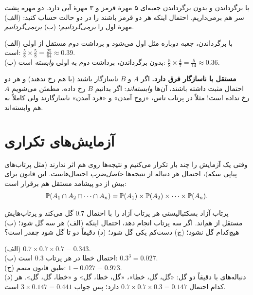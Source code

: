 \begin{example}[label=hs:ex:replace]{با برگرداندن و بدون برگرداندن}
جعبه‌ای ۵ مهرهٔ قرمز و ۳ مهرهٔ آبی دارد. دو مهره پشت سر هم برمی‌داریم. احتمال اینکه هر دو قرمز باشند را در دو حالت حساب کنید: (الف) مهرهٔ اول را \emph{برمی‌گردانیم}؛ (ب) \emph{برنمی‌گردانیم}.
\begin{solution}
(الف) با برگرداندن، جعبه دوباره مثل اول می‌شود و برداشت دوم مستقل از اولی است: $\tfrac58\times\tfrac58=\tfrac{25}{64}\approx0.39$.\\
(ب) بدون برگرداندن، برداشت دوم به اولی \emph{وابسته} است: $\tfrac58\times\tfrac47=\tfrac{5}{14}\approx0.36$.
\end{solution}
\end{example}

\begin{warning}
\textbf{مستقل با ناسازگار فرق دارد.} اگر $A$ و $B$ ناسازگار باشند (با هم رخ ندهند) و هر دو احتمال مثبت داشته باشند، آن‌ها \emph{وابسته‌اند}: اگر بدانیم $B$ رخ داده، مطمئن می‌شویم $A$ رخ نداده است! مثلاً در پرتاب تاس، «زوج آمدن» و «فرد آمدن» ناسازگارند ولی کاملاً به هم وابسته‌اند.
\end{warning}

\section{آزمایش‌های تکراری}

وقتی یک آزمایش را چند بار تکرار می‌کنیم و نتیجه‌ها روی هم اثر ندارند (مثل پرتاب‌های پیاپی سکه)، احتمال هر دنباله از نتیجه‌ها \emph{حاصل‌ضرب} احتمال‌هاست. این قانون برای بیش از دو پیشامد مستقل هم برقرار است:
\[ \P(A_1\cap A_2\cap\cdots\cap A_n)=\P(A_1)\times\P(A_2)\times\cdots\times\P(A_n). \]

\begin{example}[label=hs:ex:freethrow]{پرتاب آزاد}
بسکتبالیستی هر پرتاب آزاد را با احتمال $0.7$ گل می‌کند و پرتاب‌هایش مستقل از هم‌اند. اگر سه پرتاب انجام دهد، احتمال اینکه (الف) هر سه گل شود؛ (ب) هیچ‌کدام گل نشود؛ (ج) دست‌کم یکی گل شود؛ (د) دقیقاً دو تا گل شود چقدر است؟
\begin{solution}
(الف) $0.7\times0.7\times0.7=0.343$.\\
(ب) احتمال خطا در هر پرتاب $0.3$ است: $0.3^3=0.027$.\\
(ج) طبق قانون متمم: $1-0.027=0.973$.\\
(د) دنباله‌های با دقیقاً دو گل: «گل، گل، خطا»، «گل، خطا، گل» و «خطا، گل، گل». هر کدام احتمال $0.7\times0.7\times0.3=0.147$ دارد؛ پس جواب $3\times0.147=0.441$ است.
\end{solution}
\end{example}

